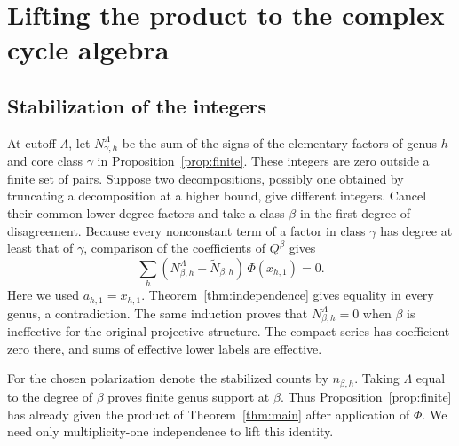 \section{Lifting the product to the complex cycle algebra}\label{sec:product}

\subsection{Stabilization of the integers}
At cutoff $\Lambda$, let $N^\Lambda_{\gamma,h}$ be the sum of the signs
of the elementary factors of genus $h$ and core class $\gamma$ in
Proposition~\ref{prop:finite}. These integers are zero outside a finite
set of pairs. Suppose two decompositions, possibly one obtained by
truncating a decomposition at a higher bound, give different integers.
Cancel their common lower-degree factors and take a class $\beta$ in
the first degree of disagreement. Because every nonconstant term of a
factor in class $\gamma$ has degree at least that of $\gamma$, comparison
of the coefficients of $Q^\beta$ gives
\[
           \sum_h (N^\Lambda_{\beta,h}-\widetilde N_{\beta,h})\,
                       \Phi(x_{h,1})=0 .
\]
Here we used $a_{h,1}=x_{h,1}$. Theorem~\ref{thm:independence} gives
equality in every genus, a contradiction. The same induction proves
that $N^\Lambda_{\beta,h}=0$ when $\beta$ is ineffective for the
original projective structure. The compact series has coefficient
zero there, and sums of effective lower labels are effective.

For the chosen polarization denote the stabilized counts by
$n_{\beta,h}$. Taking $\Lambda$ equal to the degree of $\beta$ proves
finite genus support at $\beta$. Thus Proposition~\ref{prop:finite}
has already given the product of Theorem~\ref{thm:main} after
application of $\Phi$. We need only multiplicity-one independence to
lift this identity.


